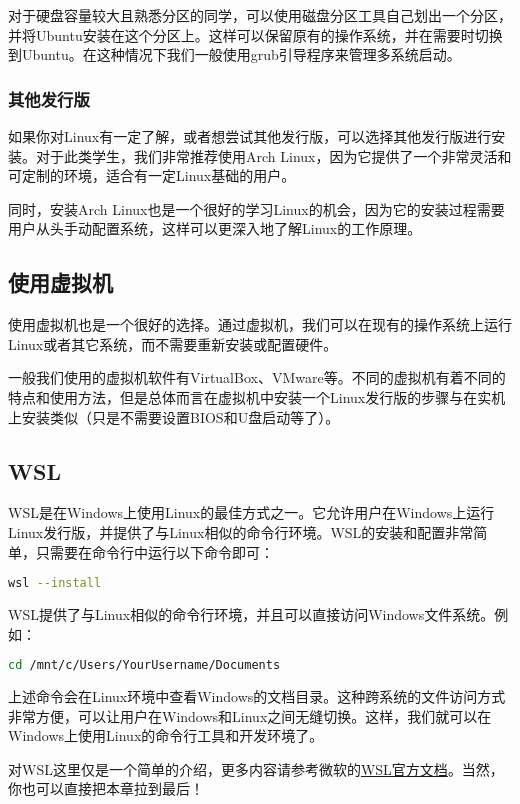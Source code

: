 对于硬盘容量较大且熟悉分区的同学，可以使用磁盘分区工具自己划出一个分区，并将Ubuntu安装在这个分区上。这样可以保留原有的操作系统，并在需要时切换到Ubuntu。在这种情况下我们一般使用grub引导程序来管理多系统启动。

\subsubsection{其他发行版}

如果你对Linux有一定了解，或者想尝试其他发行版，可以选择其他发行版进行安装。对于此类学生，我们非常推荐使用Arch Linux，因为它提供了一个非常灵活和可定制的环境，适合有一定Linux基础的用户。

同时，安装Arch Linux也是一个很好的学习Linux的机会，因为它的安装过程需要用户从头手动配置系统，这样可以更深入地了解Linux的工作原理。

\subsection{使用虚拟机}

使用虚拟机也是一个很好的选择。通过虚拟机，我们可以在现有的操作系统上运行Linux或者其它系统，而不需要重新安装或配置硬件。

一般我们使用的虚拟机软件有VirtualBox、VMware等。不同的虚拟机有着不同的特点和使用方法，但是总体而言在虚拟机中安装一个Linux发行版的步骤与在实机上安装类似（只是不需要设置BIOS和U盘启动等了）。

\subsection{WSL}

WSL是在Windows上使用Linux的最佳方式之一。它允许用户在Windows上运行Linux发行版，并提供了与Linux相似的命令行环境。WSL的安装和配置非常简单，只需要在命令行中运行以下命令即可：
\begin{lstlisting}[language=bash]
    wsl --install
\end{lstlisting}
WSL提供了与Linux相似的命令行环境，并且可以直接访问Windows文件系统。例如：

\begin{lstlisting}[language=bash]
    cd /mnt/c/Users/YourUsername/Documents
\end{lstlisting}
上述命令会在Linux环境中查看Windows的文档目录。这种跨系统的文件访问方式非常方便，可以让用户在Windows和Linux之间无缝切换。这样，我们就可以在Windows上使用Linux的命令行工具和开发环境了。

对WSL这里仅是一个简单的介绍，更多内容请参考微软的\href{https://learn.microsoft.com/en-us/windows/wsl/about}{WSL官方文档}。当然，你也可以直接把本章拉到最后！

